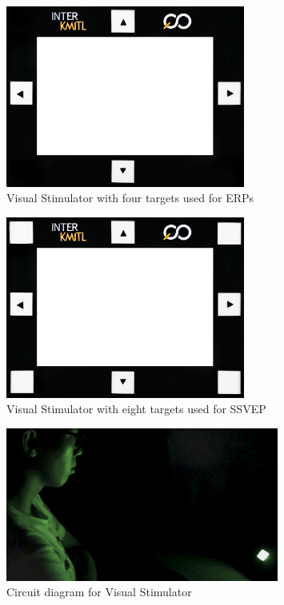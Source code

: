 \begin{figure}[ht]
	\centering
	\includegraphics[width=0.7\textwidth]{chapter7/frame_4.jpg}
	\caption{Visual Stimulator with four targets used for ERPs}
\end{figure}

\begin{figure}[ht]
	\centering
	\includegraphics[width=0.7\textwidth]{chapter7/frame_8.jpg}
	\caption{Visual Stimulator with eight targets used for SSVEP}
\end{figure}
\begin{figure}[ht]
	\centering
	\includegraphics[width=0.8\textwidth]{chapter6/experi.jpg}
	\caption{Circuit diagram for Visual Stimulator }
\end{figure}
